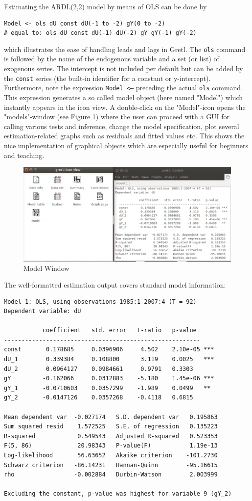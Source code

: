 \documentclass[11pt]{article}
\begin{document}
Estimating the ARDL(2,2) model by means of OLS can be done by
\begin{verbatim}
Model <- ols dU const dU(-1 to -2) gY(0 to -2)
# equal to: ols dU const dU(-1) dU(-2) gY gY(-1) gY(-2)
\end{verbatim}
which illustrates the ease of handling leads and lags in Gretl. The \texttt{ols} command is followed by the name of the endogenous variable and a set (or list) of exogenous series. The intercept is not included per default but can be added by the \texttt{const} series (the built-in identifier for a
constant or y-intercept).
Furthermore, note the expression \texttt{Model <--} preceding the actual \texttt{ols} command. This expression generates a so called model object (here named "Model") which instantly appears in the icon view. A double-click on the "Model"-icon opens the "models"-window (see Figure \ref{fig:gui_model}) where the user can proceed with a GUI for calling various tests and inference, change the model specification, plot several estimation-related graphs such as residuals and fitted values etc. This shows the nice implementation of graphical objects which are especially useful for beginners and teaching.

\begin{figure}[!h]
	\centering
	\includegraphics[width=.72\textwidth]{../figures/gui_model}
	\caption{Model Window}
	\label{fig:gui_model}
\end{figure}

The well-formatted estimation output covers standard model information:
\begin{Verbatim}[baselinestretch=0.75]
Model 1: OLS, using observations 1985:1-2007:4 (T = 92)
Dependent variable: dU

           coefficient   std. error   t-ratio   p-value 
--------------------------------------------------------
const       0.178685     0.0396906     4.502    2.10e-05 ***
dU_1        0.339384     0.108800      3.119    0.0025   ***
dU_2        0.0964127    0.0984661     0.9791   0.3303  
gY         -0.162066     0.0312883    -5.180    1.45e-06 ***
gY_1       -0.0710603    0.0357299    -1.989    0.0499   **
gY_2       -0.0147126    0.0357268    -0.4118   0.6815  

Mean dependent var  -0.027174   S.D. dependent var   0.195863
Sum squared resid    1.572525   S.E. of regression   0.135223
R-squared            0.549543   Adjusted R-squared   0.523353
F(5, 86)             20.98343   P-value(F)           1.19e-13
Log-likelihood       56.63652   Akaike criterion    -101.2730
Schwarz criterion   -86.14231   Hannan-Quinn        -95.16615
rho                 -0.002884   Durbin-Watson        2.003999

Excluding the constant, p-value was highest for variable 9 (gY_2)
\end{Verbatim}
\end{document}
